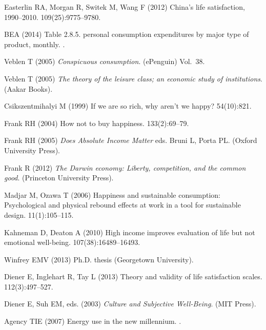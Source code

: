 \documentclass[10pt, letterpaper]{article}
\begin{document}
\begin{spacing}{1.4}
\begin{thebibliography}{10}
Easterlin RA, Morgan R, Switek M, Wang F (2012) China's life satisfaction,
  1990--2010.
  109(25):9775--9780.

BEA (2014) Table 2.8.5. personal consumption expenditures by major type of
  product, monthly.
.

Veblen T (2005) {\em Conspicuous consumption}.
\newblock (ePenguin) Vol.{}~38.

Veblen T (2005) {\em The theory of the leisure class; an economic study of
  institutions}.
\newblock (Aakar Books).

Csikszentmihalyi M (1999) If we are so rich, why aren't we happy?
 54(10):821.

Frank RH (2004) How not to buy happiness.
 133(2):69--79.

Frank RH (2005) {\em Does Absolute Income Matter} eds.{} Bruni L, Porta PL.
\newblock (Oxford University Press).

Frank R (2012) {\em The Darwin economy: Liberty, competition, and the common
  good}.
\newblock (Princeton University Press).

Madjar M, Ozawa T (2006) Happiness and sustainable consumption: Psychological
  and physical rebound effects at work in a tool for sustainable design.
  11(1):105--115.

Kahneman D, Deaton A (2010) High income improves evaluation of life but not
  emotional well-being.
  107(38):16489--16493.

Winfrey EMV (2013) Ph.D. thesis (Georgetown University).

Diener E, Inglehart R, Tay L (2013) Theory and validity of life satisfaction
  scales.
 112(3):497--527.

Diener E, Suh EM, eds. (2003) {\em Culture and Subjective Well-Being}.
\newblock (MIT Press).

Agency TIE (2007) Energy use in the new millennium.
.


\end{thebibliography}
\end{spacing}
\end{document}
